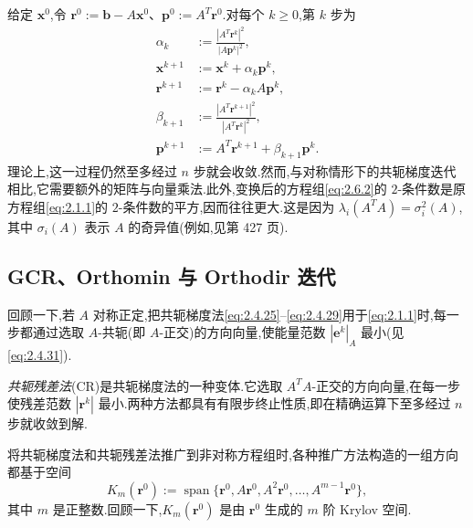 给定 \(\boldsymbol{x}^0\),令 \(\boldsymbol{r}^0:=\boldsymbol{b}-A\boldsymbol{x}^0\)、\(\boldsymbol{p}^0:=A^T\boldsymbol{r}^0\).对每个 \(k\ge0\),第 \(k\) 步为
\begin{align}
  \alpha_k&:=\frac{|A^T\boldsymbol{r}^k|^2}{|A\boldsymbol{p}^k|^2},\label{eq:2.6.3}\\
  \boldsymbol{x}^{k+1}&:=\boldsymbol{x}^k+\alpha_k\boldsymbol{p}^k,\label{eq:2.6.4}\\
  \boldsymbol{r}^{k+1}&:=\boldsymbol{r}^k-\alpha_kA\boldsymbol{p}^k,\label{eq:2.6.5}\\
  \beta_{k+1}&:=\frac{|A^T\boldsymbol{r}^{k+1}|^2}{|A^T\boldsymbol{r}^k|^2},\label{eq:2.6.6}\\
  \boldsymbol{p}^{k+1}&:=A^T\boldsymbol{r}^{k+1}+\beta_{k+1}\boldsymbol{p}^k.\label{eq:2.6.7}
\end{align}
理论上,这一过程仍然至多经过 \(n\) 步就会收敛.然而,与对称情形下的共轭梯度迭代相比,它需要额外的矩阵与向量乘法.此外,变换后的方程组\eqref{eq:2.6.2}的 \(2\)-条件数是原方程组\eqref{eq:2.1.1}的 \(2\)-条件数的平方,因而往往更大.这是因为 \(\lambda_i(A^TA)=\sigma_i^2(A)\),其中 \(\sigma_i(A)\) 表示 \(A\) 的奇异值(例如,见第 427 页).

\subsection{GCR、Orthomin 与 Orthodir 迭代}\label{sec:2.6.1}

回顾一下,若 \(A\) 对称正定,把共轭梯度法\eqref{eq:2.4.25}–\eqref{eq:2.4.29}用于\eqref{eq:2.1.1}时,每一步都通过选取 \(A\)-共轭(即 \(A\)-正交)的方向向量,使能量范数 \(|\boldsymbol{e}^k|_A\) 最小(见\eqref{eq:2.4.31}).

\emph{共轭残差法}(CR)是共轭梯度法的一种变体.它选取 \(A^TA\)-正交的方向向量,在每一步使残差范数 \(|\boldsymbol{r}^k|\) 最小.两种方法都具有有限步终止性质,即在精确运算下至多经过 \(n\) 步就收敛到解.

将共轭梯度法和共轭残差法推广到非对称方程组时,各种推广方法构造的一组方向都基于空间
\begin{equation}\label{eq:2.6.8}
  K_m(\boldsymbol{r}^0):=\operatorname{span}\{\boldsymbol{r}^0,A\boldsymbol{r}^0,A^2\boldsymbol{r}^0,\ldots,
                                                   A^{m-1}\boldsymbol{r}^0\},
\end{equation}
其中 \(m\) 是正整数.回顾一下,\(K_m(\boldsymbol{r}^0)\) 是由 \(\boldsymbol{r}^0\) 生成的 \(m\) 阶 Krylov 空间.

